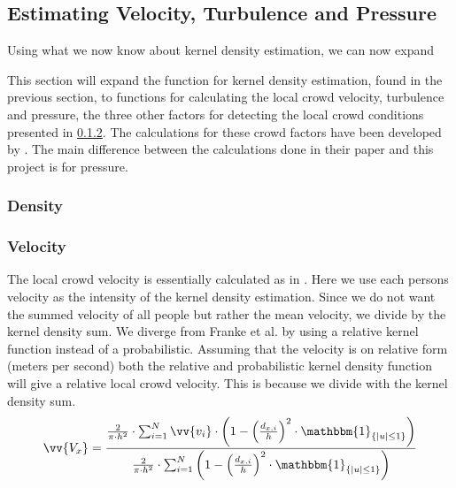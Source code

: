 
\subsection{Estimating Velocity, Turbulence and Pressure}
Using what we now know about kernel density estimation, we can now expand 

This section will expand the function for kernel density estimation, found in the previous section, to functions for calculating the local crowd velocity, turbulence and pressure, the three other factors for detecting the local crowd conditions presented in \cref{}. The calculations for these crowd factors have been developed by \citet{wirz2012inferring}. The main difference between the calculations done in their paper and this project is for pressure.

\subsubsection{Density}


\subsubsection{Velocity}
The local crowd velocity is essentially calculated as in \citet{wirz2012inferring}. Here we use each persons velocity as the intensity of the kernel density estimation. Since we do not want the summed velocity of all people but rather the mean velocity, we divide by the kernel density sum. We diverge from Franke et al. by using a relative kernel function instead of a probabilistic. Assuming that the velocity is on relative form (meters per second) both the relative and probabilistic kernel density function will give a relative local crowd velocity. This is because we divide with the kernel density sum.
\begin{equation}
\label{eq:}
\vv{V_x} = \frac{\frac{2}{\pi \cdot h^2} \cdot \sum_{i=1}^N \vv{v_i} \cdot \left(1-\left(\frac{d_{x,i}}{h}\right)^2 \cdot \mathbbm{1}_{\{|u| \leq 1\} }\right)}{\frac{2}{\pi \cdot h^2} \cdot \sum_{i=1}^N \left(1-\left(\frac{d_{x,i}}{h}\right)^2 \cdot \mathbbm{1}_{\{|u| \leq 1\} }\right)}
\end{equation}

